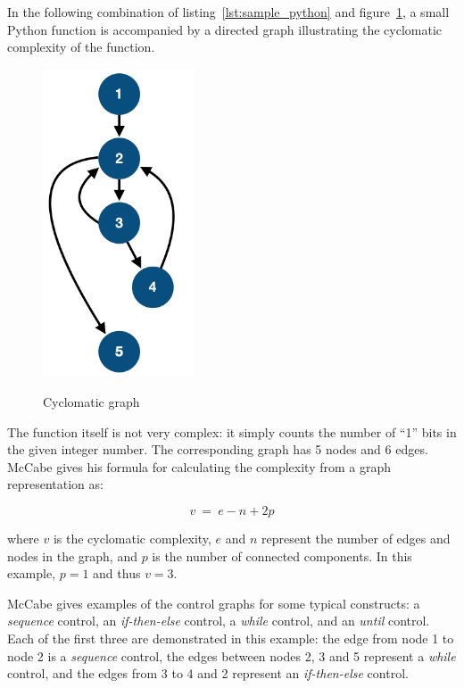 In the following combination of listing~\ref{lst:sample_python} and figure~\ref{fig:image:mccabe}, a small Python function is accompanied by a directed graph illustrating the cyclomatic complexity of the function.

\begin{figure}[ht]
    \centering
    \begin{minipage}[t]{.45\textwidth}
        
    \end{minipage}\hfill
    \begin{minipage}[t]{.45\textwidth}
        \caption{Cyclomatic graph}
        \centering
        \includegraphics[width=0.4\textwidth]{figures/mccabe.png}
        \label{fig:image:mccabe}
    \end{minipage}
\end{figure}

The function itself is not very complex: it simply counts the number of ``1'' bits in the given integer number. The corresponding graph has 5 nodes and 6 edges. McCabe gives his formula for calculating the complexity from a graph representation as:

\[v~=~e - n + 2p\]

where $v$ is the cyclomatic complexity, $e$ and $n$ represent the number of edges and nodes in the graph, and $p$ is the number of connected components. In this example, $p=1$ and thus $v=3$.

McCabe gives examples of the control graphs for some typical constructs: a \textit{sequence} control, an \textit{if-then-else} control, a \textit{while} control, and an \textit{until} control. Each of the first three are demonstrated in this example: the edge from node 1 to node 2 is a \textit{sequence} control, the edges between nodes 2, 3 and 5 represent a \textit{while} control, and the edges from 3 to 4 and 2 represent an \textit{if-then-else} control.

